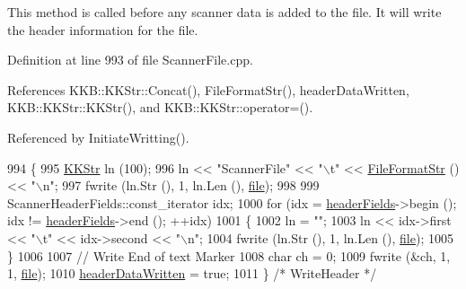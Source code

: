 This method is called before any scanner data is added to the file. It will write the header information for the file. 



Definition at line 993 of file Scanner\+File.\+cpp.



References K\+K\+B\+::\+K\+K\+Str\+::\+Concat(), File\+Format\+Str(), header\+Data\+Written, K\+K\+B\+::\+K\+K\+Str\+::\+K\+K\+Str(), and K\+K\+B\+::\+K\+K\+Str\+::operator=().



Referenced by Initiate\+Writting().


\begin{DoxyCode}
994 \{
995   \hyperlink{class_k_k_b_1_1_k_k_str}{KKStr}  ln (100);
996   ln << \textcolor{stringliteral}{"ScannerFile"} << \textcolor{stringliteral}{"\(\backslash\)t"} << \hyperlink{class_k_k_l_s_c_1_1_scanner_file_a669f6d21fef4cb0731f385a51a689aad}{FileFormatStr} () << \textcolor{stringliteral}{"\(\backslash\)n"};
997   fwrite (ln.Str (), 1, ln.Len (), \hyperlink{class_k_k_l_s_c_1_1_scanner_file_a26db15f7823ce67b1621da17468ec807}{file});
998   
999   ScannerHeaderFields::const\_iterator  idx;
1000   \textcolor{keywordflow}{for}  (idx = \hyperlink{class_k_k_l_s_c_1_1_scanner_file_a31b2da4ffa80bf114aab2340d3104f3e}{headerFields}->begin ();  idx != \hyperlink{class_k_k_l_s_c_1_1_scanner_file_a31b2da4ffa80bf114aab2340d3104f3e}{headerFields}->end ();  ++idx)
1001   \{
1002     ln = \textcolor{stringliteral}{""};
1003     ln << idx->first << \textcolor{stringliteral}{"\(\backslash\)t"} << idx->second << \textcolor{stringliteral}{"\(\backslash\)n"};
1004     fwrite (ln.Str (), 1, ln.Len (), \hyperlink{class_k_k_l_s_c_1_1_scanner_file_a26db15f7823ce67b1621da17468ec807}{file});
1005   \}
1006 
1007   \textcolor{comment}{// Write End of text Marker}
1008   \textcolor{keywordtype}{char}  ch = 0;
1009   fwrite (&ch, 1, 1, \hyperlink{class_k_k_l_s_c_1_1_scanner_file_a26db15f7823ce67b1621da17468ec807}{file});
1010   \hyperlink{class_k_k_l_s_c_1_1_scanner_file_af07a14225690ce6ff6c2a9194323f0d4}{headerDataWritten} = \textcolor{keyword}{true};
1011 \}  \textcolor{comment}{/* WriteHeader */}
\end{DoxyCode}
